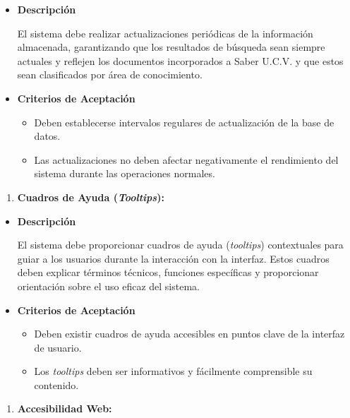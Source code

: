 \documentclass[
  12pt,
  openany]{book}
\providecommand{\tightlist}{%
  \setlength{\itemsep}{0pt}\setlength{\parskip}{0pt}}
\begin{document}
\begin{itemize}
\item
  \textbf{Descripción}

  El sistema debe realizar actualizaciones periódicas de la información almacenada, garantizando que los resultados de búsqueda sean siempre actuales y reflejen los documentos incorporados a Saber U.C.V. y que estos sean clasificados por área de conocimiento.
\item
  \textbf{Criterios de Aceptación}

  \begin{itemize}
  \item
    Deben establecerse intervalos regulares de actualización de la base de datos.
  \item
    Las actualizaciones no deben afectar negativamente el rendimiento del sistema durante las operaciones normales.
  \end{itemize}
\end{itemize}

\begin{enumerate}
\def\labelenumi{\arabic{enumi}.}
\setcounter{enumi}{7}
\tightlist
\item
  \textbf{Cuadros de Ayuda (\emph{Tooltips}):}
\end{enumerate}

\begin{itemize}
\item
  \textbf{Descripción}

  El sistema debe proporcionar cuadros de ayuda (\emph{tooltips}) contextuales para guiar a los usuarios durante la interacción con la interfaz. Estos cuadros deben explicar términos técnicos, funciones específicas y proporcionar orientación sobre el uso eficaz del sistema.
\item
  \textbf{Criterios de Aceptación}

  \begin{itemize}
  \item
    Deben existir cuadros de ayuda accesibles en puntos clave de la interfaz de usuario.
  \item
    Los \emph{tooltips} deben ser informativos y fácilmente comprensible su contenido.
  \end{itemize}
\end{itemize}

\begin{enumerate}
\def\labelenumi{\arabic{enumi}.}
\setcounter{enumi}{8}
\tightlist
\item
  \textbf{Accesibilidad Web:}
\end{enumerate}
\end{document}
